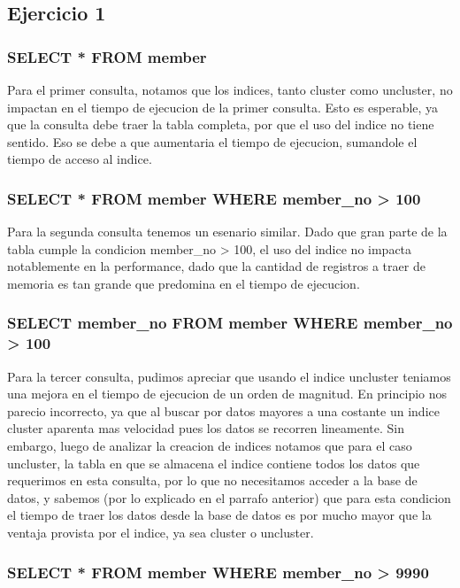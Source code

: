 \subsection{Ejercicio 1}

\subsubsection{SELECT * FROM member}
Para el primer consulta, notamos que los indices, tanto cluster como uncluster, no impactan en el tiempo de
ejecucion de la primer consulta. Esto es esperable, ya que la consulta  debe traer la tabla completa,
por que el uso del indice no tiene sentido. Eso se debe a que aumentaria el tiempo de ejecucion, sumandole el tiempo de  
acceso al indice.

\subsubsection{SELECT * FROM member WHERE member_no > 100}
Para la segunda consulta tenemos un esenario similar. Dado que gran parte de la tabla cumple la 
condicion member_no > 100, el uso del indice no impacta notablemente en la performance, dado 
que la cantidad de registros a traer de memoria es tan grande que predomina en el 
tiempo de ejecucion.

\subsubsection{SELECT member_no FROM member WHERE member_no > 100}
Para la tercer consulta, pudimos apreciar que usando el indice uncluster teniamos una mejora 
en el tiempo de ejecucion de un orden de magnitud. En principio nos parecio incorrecto, ya que
al buscar por datos mayores a una costante un indice cluster aparenta mas velocidad pues los datos 
se recorren lineamente. Sin embargo, luego de analizar la creacion de indices notamos que para el caso
uncluster, la tabla en que se almacena el indice contiene todos los datos que requerimos en esta consulta,
por lo que no necesitamos acceder a la base de datos, y sabemos (por lo explicado en el parrafo anterior) 
que para esta condicion el tiempo de traer los datos desde la base de datos es por mucho mayor que la ventaja
provista por el indice, ya sea cluster o uncluster.

\subsubsection{SELECT * FROM member WHERE member_no > 9990}



